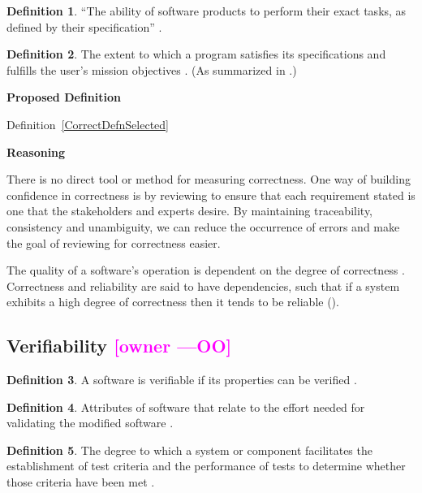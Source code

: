 \documentclass[letterpaper,cleveref]{lipics-v2019}
\newcommand{\authornote}[3]{\textcolor{#1}{[#3 ---#2]}}
\newcommand{\authornote}[3]{}
\newcommand{\oo}[1]{\authornote{magenta}{OO}{#1}} %
\theoremstyle{definition}
\newtheorem{defn}{Definition}
\begin{document}
\begin{defn}
  ``The ability of software products to perform their exact tasks, as defined by
  their specification'' \citep{meyer1988object}.
\end{defn}

\begin{defn}
  The extent to which a program satisfies its specifications and fulfills the
  user's mission objectives \citep{McCallEtAl1977}. (As summarized in
  \citet{VanVliet2000}.)
\end{defn}

\noindent \textbf{Proposed Definition}

Definition~\ref{CorrectDefnSelected}
	
\noindent \textbf{Reasoning}

There is no direct tool or method for measuring correctness. One way of building
confidence in correctness is by reviewing to ensure that each requirement stated
is one that the stakeholders and experts desire.  By maintaining traceability,
consistency and unambiguity, we can reduce the occurrence of errors and make the
goal of reviewing for correctness easier.

The quality of a software's operation is dependent on the degree of correctness
\citep{berander2005software}. Correctness and reliability are said to have
dependencies, such that if a system exhibits a high degree of correctness then
it tends to be reliable (\citep{GhezziEtAl2003}).

\subsection{Verifiability \oo{owner}}

\begin{defn}
  A software is verifiable if its properties can be verified
  \citep{GhezziEtAl2003}.
\end{defn}

\begin{defn}
  Attributes of software that relate to the effort needed for validating the
  modified software \citep{berander2005software}.
\end{defn}

\begin{defn}
  The degree to which a system or component facilitates the establishment of
  test criteria and the performance of tests to determine whether those criteria
  have been met \citep{IEEEStdGlossarySET1990}.
\end{defn}
\end{document}
